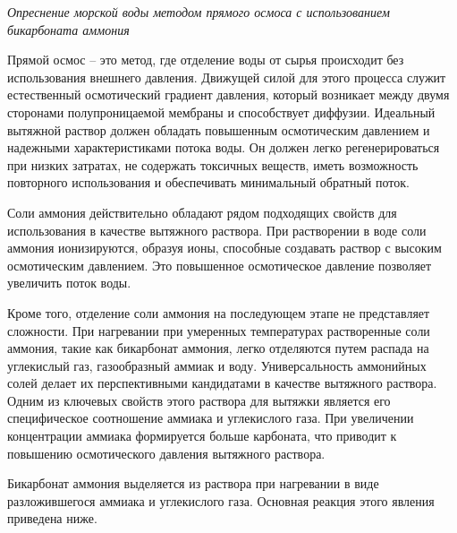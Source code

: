 \emph{Опреснение морской воды методом прямого осмоса с использованием
бикарбоната аммония}

Прямой осмос -- это метод, где отделение воды от сырья происходит без
использования внешнего давления. Движущей силой для этого процесса
служит естественный осмотический градиент давления, который возникает
между двумя сторонами полупроницаемой мембраны и способствует диффузии.
Идеальный вытяжной раствор должен обладать повышенным осмотическим
давлением и надежными характеристиками потока воды. Он должен легко
регенерироваться при низких затратах, не содержать токсичных веществ,
иметь возможность повторного использования и обеспечивать минимальный
обратный поток.

Соли аммония действительно обладают рядом подходящих свойств для
использования в качестве вытяжного раствора. При растворении в воде соли
аммония ионизируются, образуя ионы, способные создавать раствор с
высоким осмотическим давлением. Это повышенное осмотическое давление
позволяет увеличить поток воды.

Кроме того, отделение соли аммония на последующем этапе не представляет
сложности. При нагревании при умеренных температурах растворенные соли
аммония, такие как бикарбонат аммония, легко отделяются путем распада на
углекислый газ, газообразный аммиак и воду. Универсальность аммонийных
солей делает их перспективными кандидатами в качестве вытяжного
раствора. Одним из ключевых свойств этого раствора для вытяжки является
его специфическое соотношение аммиака и углекислого газа. При увеличении
концентрации аммиака формируется больше карбоната, что приводит к
повышению осмотического давления вытяжного раствора.

Бикарбонат аммония выделяется из раствора при нагревании в виде
разложившегося аммиака и углекислого газа. Основная реакция этого
явления приведена ниже.

% 


